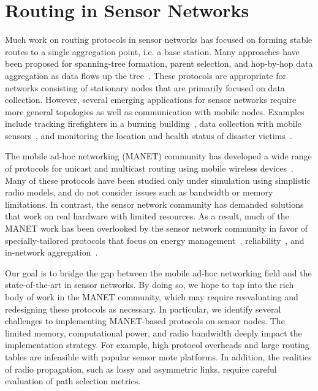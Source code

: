 \section{Routing in Sensor Networks}

Much work on routing protocols in sensor networks has focused
on forming stable routes to a single aggregation point, i.e. a base
station. Many approaches have been proposed for spanning-tree formation,
parent selection, and hop-by-hop data aggregation as data flows up the
tree~\cite{awoo-multihop,dimensions,tinydb-osdi,nath-synopsis-diffusion}.
These protocols are appropriate for networks consisting
of stationary nodes that are primarily focused on data
collection. However, several emerging applications for sensor
networks require more general topologies as well as
communication with mobile nodes. 
Examples include tracking firefighters in a burning
building~\cite{paul-wright-firefighter}, data collection with mobile
sensors~\cite{nims,kansal-mobisys04,zebranet-mobisys04},
and monitoring the location and health status of disaster
victims~\cite{codeblue-ieeepc}.

The mobile ad-hoc networking (MANET) community has developed a wide range
of protocols for unicast and multicast routing using mobile wireless
devices~\cite{aodv,admr,dsr,dsdv}. 
Many of these protocols have been studied only under simulation 
using simplistic radio models, and do not consider issues such as bandwidth
or memory limitations. In contrast, the sensor network community has 
demanded solutions that work on real hardware with limited resources.
As a result, much of the MANET work has been overlooked by the sensor
network community in favor of specially-tailored protocols that focus
on energy management~\cite{stem,leach}, 
reliability~\cite{awoo-multihop,psfq,esrt}, and in-network
aggregation~\cite{tinydb-osdi,nath-synopsis-diffusion}.

Our goal is to bridge the gap between the mobile ad-hoc networking
field and the state-of-the-art in sensor networks. 
By doing so, we hope to tap into the rich body of work in the MANET
community, which may require reevaluating and redesigning these 
protocols as necessary. In particular, we identify several challenges
to implementing MANET-based protocols on sensor nodes. The
limited memory, computational power, and radio bandwidth deeply impact
the implementation strategy. 
For example, high protocol overheads and
large routing tables are infeasible with popular sensor mote platforms.
In addition, the realities of radio propagation, such as lossy and 
asymmetric links, require careful evaluation of path selection metrics.

